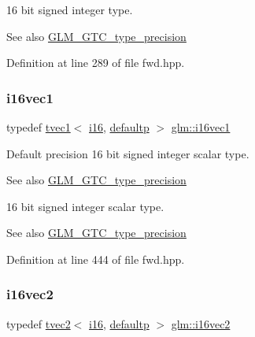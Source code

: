 16 bit signed integer type. \begin{DoxySeeAlso}{See also}
\mbox{\hyperlink{group__gtc__type__precision}{G\+L\+M\+\_\+\+G\+T\+C\+\_\+type\+\_\+precision}} 
\end{DoxySeeAlso}


Definition at line 289 of file fwd.\+hpp.

\mbox{\label{group__gtc__type__precision_gacec84a02174e44363dd105769fb22473}} 
\subsubsection{\texorpdfstring{i16vec1}{i16vec1}}
{\footnotesize\ttfamily typedef \mbox{\hyperlink{structglm_1_1tvec1}{tvec1}}$<$ \mbox{\hyperlink{group__gtc__type__precision_ga35e5542ca05b29cc256fdafb8503d1fd}{i16}}, \mbox{\hyperlink{namespaceglm_a0f04f086094c747d227af4425893f545a9d21ccd8b5a009ec7eb7677befc3bf51}{defaultp}} $>$ \mbox{\hyperlink{group__gtc__type__precision_gacec84a02174e44363dd105769fb22473}{glm\+::i16vec1}}}

Default precision 16 bit signed integer scalar type. \begin{DoxySeeAlso}{See also}
\mbox{\hyperlink{group__gtc__type__precision}{G\+L\+M\+\_\+\+G\+T\+C\+\_\+type\+\_\+precision}}
\end{DoxySeeAlso}
16 bit signed integer scalar type. \begin{DoxySeeAlso}{See also}
\mbox{\hyperlink{group__gtc__type__precision}{G\+L\+M\+\_\+\+G\+T\+C\+\_\+type\+\_\+precision}} 
\end{DoxySeeAlso}


Definition at line 444 of file fwd.\+hpp.

\mbox{\label{group__gtc__type__precision_ga37af364ff13fb791571dd324dfd3ca89}} 
\subsubsection{\texorpdfstring{i16vec2}{i16vec2}}
{\footnotesize\ttfamily typedef \mbox{\hyperlink{structglm_1_1tvec2}{tvec2}}$<$ \mbox{\hyperlink{group__gtc__type__precision_ga35e5542ca05b29cc256fdafb8503d1fd}{i16}}, \mbox{\hyperlink{namespaceglm_a0f04f086094c747d227af4425893f545a9d21ccd8b5a009ec7eb7677befc3bf51}{defaultp}} $>$ \mbox{\hyperlink{group__gtc__type__precision_ga37af364ff13fb791571dd324dfd3ca89}{glm\+::i16vec2}}}

